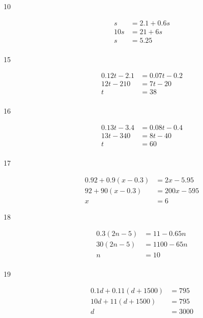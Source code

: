 \documentclass[letterpaper]{exam}
\begin{document}
\begin{description}
      \item[10]
        \begin{align*}
          s   & = 2.1 + 0.6s \\
          10s & = 21 + 6s \\
          s   & = \boxed{ 5.25 } \\
        \end{align*}

      \item[15]
        \begin{align*}
          0.12t - 2.1 & = 0.07t - 0.2 \\
          12t - 210   & = 7t - 20 \\
          t           & = \boxed{ 38 } \\
        \end{align*}

      \item[16]
        \begin{align*}
          0.13t - 3.4      & = 0.08t - 0.4 \\
          13t - 340        & = 8t - 40 \\
          t                & = \boxed{ 60 } \\
        \end{align*}

      \item[17]
        \begin{align*}
          0.92 + 0.9(x - 0.3)      & = 2x - 5.95 \\
          92 + 90(x - 0.3)         & = 200x - 595 \\
          x                        & = \boxed{ 6 }
        \end{align*}

      \item[18]
        \begin{align*}
          0.3(2n - 5) & = 11 - 0.65n \\
          30(2n - 5)  & = 1100 - 65n \\
          n           & = \boxed{ 10 } \\
        \end{align*}

      \item[19]
        \begin{align*}
          0.1d + 0.11 (d + 1500) & = 795 \\
          10d + 11 (d + 1500)    & = 795 \\
          d                      & = \boxed{ 3000 } \\
        \end{align*}


\end{description}
\end{document}
